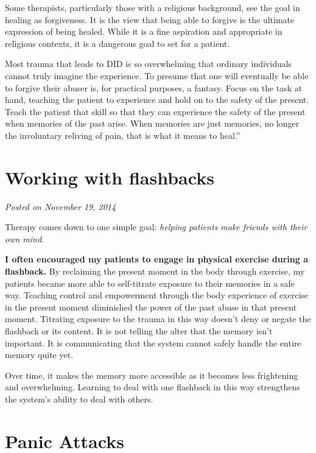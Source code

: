 \documentclass[]{book}
\begin{document}
Some therapists, particularly those with a religious background, see the goal in healing as forgiveness. It is the view that being able to forgive is the ultimate expression of being healed. While it is a fine aspiration and appropriate in religious contexts, it is a dangerous goal to set for a patient.

Most trauma that leads to DID is so overwhelming that ordinary individuals cannot truly imagine the experience. To presume that one will eventually be able to forgive their abuser is, for practical purposes, a fantasy. Focus on the task at hand, teaching the patient to experience and hold on to the safety of the present. Teach the patient that skill so that they can experience the safety of the present when memories of the past arise. When memories are just memories, no longer the involuntary reliving of pain, that is what it means to heal.''

\hypertarget{working-with-flashbacks}{%
\section{Working with flashbacks}\label{working-with-flashbacks}}

\emph{Posted on November 19, 2014}

Therapy comes down to one simple goal: \emph{helping patients make friends with their own mind}.

\textbf{I often encouraged my patients to engage in physical exercise during a flashback.} By reclaiming the present moment in the body through exercise, my patients became more able to self-titrate exposure to their memories in a safe way. Teaching control and empowerment through the body experience of exercise in the present moment diminished the power of the past abuse in that present moment. Titrating exposure to the trauma in this way doesn't deny or negate the flashback or its content. It is not telling the alter that the memory isn't important. It is communicating that the system cannot safely handle the entire memory quite yet.

Over time, it makes the memory more accessible as it becomes less frightening and overwhelming. Learning to deal with one flashback in this way strengthens the system's ability to deal with others.

\hypertarget{panic-attacks}{%
\section{Panic Attacks}\label{panic-attacks}}
\end{document}
